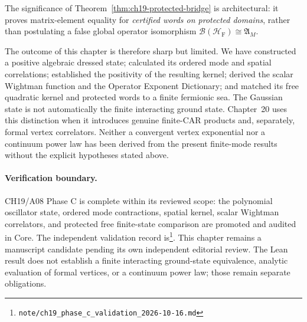 The significance of Theorem~\ref{thm:ch19-protected-bridge} is architectural: it proves
matrix-element equality for \emph{certified words on protected domains}, rather than
postulating a false global operator isomorphism $\mathcal B(\mathcal H_{\mathrm F}) \cong \mathfrak A_M$.

The outcome of this chapter is therefore sharp but limited.  We have
constructed a positive algebraic dressed state; calculated its ordered
mode and spatial correlations; established the positivity of the
resulting kernel; derived the scalar Wightman function and the Operator Exponent Dictionary;
and matched its free quadratic kernel and protected words to a finite fermionic sea.
The Gaussian state is not automatically the finite interacting ground state.
Chapter~20 uses this distinction when it introduces genuine finite-CAR products and, separately,
formal vertex correlators.  Neither a convergent vertex exponential
nor a continuum power law has been derived from the present
finite-mode results without the explicit hypotheses stated above.

\paragraph{Verification boundary.}
CH19/A08 Phase C is complete within its reviewed scope: the polynomial
oscillator state, ordered mode contractions, spatial kernel, scalar Wightman
correlators, and protected free finite-state comparison are promoted and audited in Core.  The
independent validation record is\footnote{\texttt{note/ch19\_phase\_c\_validation\_2026-10-16.md}}.
This chapter remains a manuscript candidate pending its own independent
editorial review.  The Lean result does not establish a finite interacting
ground-state equivalence, analytic evaluation of formal vertices, or a
continuum power law; those remain separate obligations.

